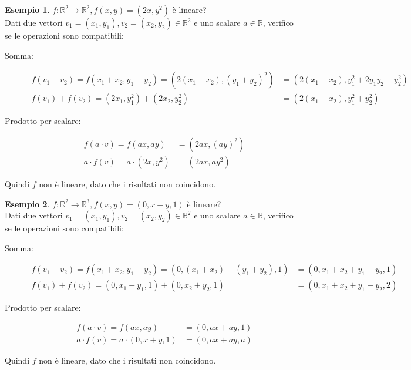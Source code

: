 \documentclass[a4paper]{article}
\theoremstyle{definition}
\newtheorem*{es}{Esempio}
\begin{document}
\begin{es}
	$f: \mathbb{R}^2 \rightarrow \mathbb{R}^2, f(x, y) = (2x, y^2)$ è lineare? \\
	Dati due vettori $v_1 = (x_1, y_1), v_2 = (x_2, y_2) \in \mathbb{R}^2$ e uno scalare $a \in \mathbb{R}$, verifico se le operazioni sono compatibili:
	\begin{description}
		\item[Somma:]
			\begin{align*}
				f(v_1 + v_2) = f(x_1 + x_2, y_1 + y_2) = (2(x_1 + x_2), (y_1 + y_2)^2) & = (2(x_1 + x_2), y_1^2 + 2y_1y_2 + y_2^2) \\
				f(v_1) + f(v_2) = (2x_1, y_1^2) + (2x_2, y_2^2)                        & = (2(x_1 + x_2), y_1^2 + y_2^2)
			\end{align*}
		\item[Prodotto per scalare:]
			\begin{align*}
				f(a \cdot v) = f(ax, ay)         & = (2ax, (ay)^2) \\
				a \cdot f(v) = a \cdot (2x, y^2) & = (2ax, ay^2)
			\end{align*}
	\end{description}
	Quindi $f$ non è lineare, dato che i risultati non coincidono.
\end{es}
\begin{es}
	$f: \mathbb{R}^2 \rightarrow \mathbb{R}^3, f(x, y) = (0, x+y, 1)$ è lineare? \\
	Dati due vettori $v_1 = (x_1, y_1), v_2 = (x_2, y_2) \in \mathbb{R}^2$ e uno scalare $a \in \mathbb{R}$, verifico se le operazioni sono compatibili:
	\begin{description}
		\item[Somma:] 
		\begin{align*}
			f(v_1 + v_2) = f(x_1 + x_2, y_1 + y_2) = (0, (x_1 + x_2) + (y_1 + y_2), 1) & = (0, x_1 + x_2 + y_1 + y_2, 1) \\
			f(v_1) + f(v_2) = (0, x_1 + y_1, 1) + (0, x_2 + y_2, 1)                    & = (0, x_1 + x_2 + y_1 + y_2, 2)
		\end{align*}
		\item[Prodotto per scalare:]
		\begin{align*}
			f(a \cdot v) = f(ax, ay)             & = (0, ax + ay, 1) \\
			a \cdot f(v) = a \cdot (0, x + y, 1) & = (0, ax + ay, a)
		\end{align*}
	\end{description}
	Quindi $f$ non è lineare, dato che i risultati non coincidono.
\end{es}
\end{document}

